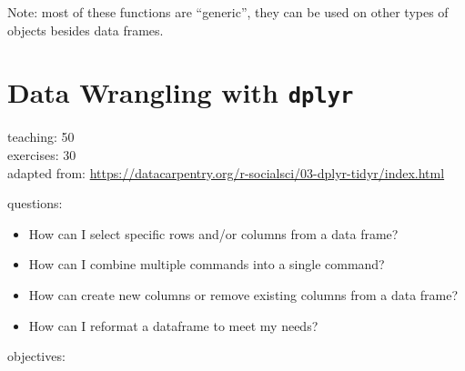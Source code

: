 \documentclass[]{book}
\providecommand{\tightlist}{%
  \setlength{\itemsep}{0pt}\setlength{\parskip}{0pt}}
\begin{document}
Note: most of these functions are ``generic'', they can be used on other
types of objects besides data frames.

\chapter{\texorpdfstring{Data Wrangling with
\texttt{dplyr}}{Data Wrangling with dplyr}}\label{dplyr}

teaching: 50\\
exercises: 30\\
adapted from:
\url{https://datacarpentry.org/r-socialsci/03-dplyr-tidyr/index.html}

questions:

\begin{itemize}
\tightlist
\item
  How can I select specific rows and/or columns from a data frame?\\
\item
  How can I combine multiple commands into a single command?\\
\item
  How can create new columns or remove existing columns from a data
  frame?\\
\item
  How can I reformat a dataframe to meet my needs?
\end{itemize}

objectives:
\end{document}
